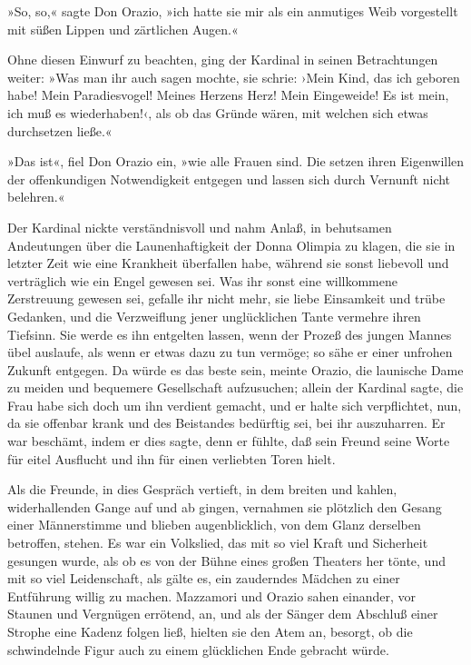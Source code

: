 »So, so,« sagte Don Orazio, »ich hatte sie mir als ein anmutiges
Weib vorgestellt mit süßen Lippen und zärtlichen Augen.«

Ohne diesen Einwurf zu beachten, ging der Kardinal in seinen
Betrachtungen weiter: »Was man ihr auch sagen mochte, sie schrie:
›Mein Kind, das ich geboren habe! Mein Paradiesvogel! Meines
Herzens Herz! Mein Eingeweide! Es ist mein, ich muß es
wiederhaben!‹, als ob das Gründe wären, mit welchen sich etwas
durchsetzen ließe.«

»Das ist«, fiel Don Orazio ein, »wie alle Frauen sind. Die setzen
ihren Eigenwillen der offenkundigen Notwendigkeit entgegen und
lassen sich durch Vernunft nicht belehren.«

\pagenum{[65]}Der Kardinal nickte verständnisvoll und nahm Anlaß,
in behutsamen Andeutungen über die Launenhaftigkeit der Donna
Olimpia zu klagen, die sie in letzter Zeit wie eine Krankheit
überfallen habe, während sie sonst liebevoll und verträglich wie
ein Engel gewesen sei. Was ihr sonst eine willkommene Zerstreuung
gewesen sei, gefalle ihr nicht mehr, sie liebe Einsamkeit und trübe
Gedanken, und die Verzweiflung jener unglücklichen Tante vermehre
ihren Tiefsinn. Sie werde es ihn entgelten lassen, wenn der Prozeß
des jungen Mannes übel auslaufe, als wenn er etwas dazu zu tun
vermöge; so sähe er einer unfrohen Zukunft entgegen. Da würde es
das beste sein, meinte Orazio, die launische Dame zu meiden und
bequemere Gesellschaft aufzusuchen; allein der Kardinal sagte, die
Frau habe sich doch um ihn verdient gemacht, und er halte sich
verpflichtet, nun, da sie offenbar krank und des Beistandes
bedürftig sei, bei ihr auszuharren. Er war beschämt, indem er dies
sagte, denn er fühlte, daß sein Freund seine Worte für eitel
Ausflucht und ihn für einen verliebten Toren hielt.

Als die Freunde, in dies Gespräch vertieft, in dem breiten und
kahlen, widerhallenden Gange auf und ab gingen, vernahmen sie
plötzlich den Gesang einer Männerstimme und blieben augenblicklich,
von dem Glanz derselben betroffen, stehen. Es war ein Volkslied,
das mit so viel Kraft und Sicherheit gesungen wurde, als ob es von
der Bühne eines großen Theaters her tönte, und mit so viel
Leidenschaft, als gälte es, ein zauderndes Mädchen zu einer
Entführung willig zu machen. Mazzamori und Orazio sahen einander,
vor Staunen und Vergnügen errötend, an, und als der Sänger dem
Abschluß einer Strophe eine Kadenz folgen ließ, hielten sie den
Atem an, besorgt, ob die schwindelnde Figur auch zu einem
glücklichen Ende gebracht würde.

